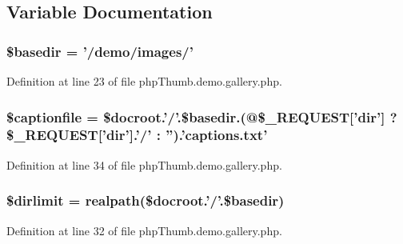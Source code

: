 \subsection{\-Variable \-Documentation}
\hypertarget{php_thumb_8demo_8gallery_8php_aaa31838e86513cb3a51e398894ee4b35}{
\subsubsection[{\$basedir}]{\setlength{\rightskip}{0pt plus 5cm}\$basedir = '/demo/images/'}}\label{php_thumb_8demo_8gallery_8php_aaa31838e86513cb3a51e398894ee4b35}


\-Definition at line 23 of file php\-Thumb.\-demo.\-gallery.\-php.

\hypertarget{php_thumb_8demo_8gallery_8php_a3402a0328e5ea40b6729476ebe3edbc8}{
\subsubsection[{\$captionfile}]{\setlength{\rightskip}{0pt plus 5cm}\$captionfile = \$docroot.'/'.\$basedir.(@\$\-\_\-\-R\-E\-Q\-U\-E\-S\-T\mbox{[}'dir'\mbox{]} ? \$\-\_\-\-R\-E\-Q\-U\-E\-S\-T\mbox{[}'dir'\mbox{]}.'/' \-: '').'captions.\-txt'}}\label{php_thumb_8demo_8gallery_8php_a3402a0328e5ea40b6729476ebe3edbc8}


\-Definition at line 34 of file php\-Thumb.\-demo.\-gallery.\-php.

\hypertarget{php_thumb_8demo_8gallery_8php_a1ae50c67691763d28241517c6b341750}{
\subsubsection[{\$dirlimit}]{\setlength{\rightskip}{0pt plus 5cm}\$dirlimit = realpath(\$docroot.'/'.\$basedir)}}\label{php_thumb_8demo_8gallery_8php_a1ae50c67691763d28241517c6b341750}


\-Definition at line 32 of file php\-Thumb.\-demo.\-gallery.\-php.

